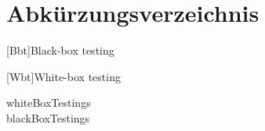 \thispagestyle{empty}
\chapter*{Abkürzungsverzeichnis}

\begin{acronym}[EuGH]

    [Bbt]{Black-box testing}

    [Wbt]{White-box testing}

\end{acronym}

\acsp{whiteBoxTesting}\\
\acsp{blackBoxTesting}
